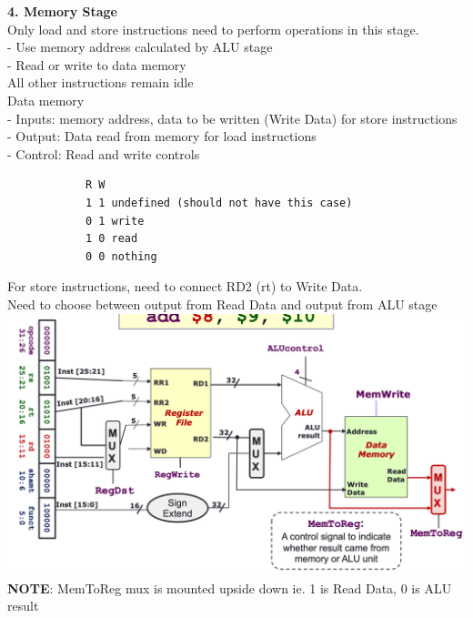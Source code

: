 \documentclass[10pt, a4paper]{article}
\newcommand{\highlight}[1]{{\color{red}\textbf{#1}}}
\begin{document}
\begin{multicols*}{3}
		\textbf{4. Memory Stage}\\
		Only load and store instructions need to perform operations in this stage.\\
		- Use memory address calculated by ALU stage\\
		- Read or write to data memory\\
		All other instructions remain idle\\
		Data memory\\
		- Inputs: memory address, data to be written (Write Data) for store instructions\\
		- Output: Data read from memory for load instructions\\
		- Control: Read and write controls
		\begin{verbatim}
			R W
			1 1 undefined (should not have this case)
			0 1 write
			1 0 read
			0 0 nothing
		\end{verbatim} 
		For store instructions, need to connect RD2 (rt) to Write Data.\\
		Need to choose between output from Read Data and output from ALU stage\\
		\includegraphics[scale=.25]{./assets/memStage}\\
		\highlight{NOTE}: MemToReg mux is mounted upside down ie. 1 is Read Data, 0 is ALU result\\
		 

\end{multicols*}
\end{document}
